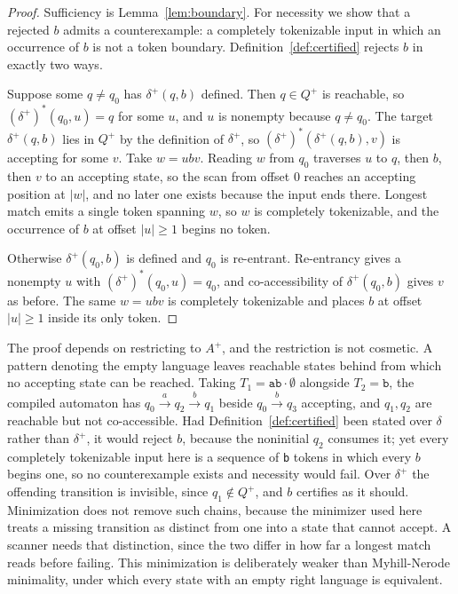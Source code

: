 \documentclass[11pt,a4paper]{article}
\theoremstyle{definition}
\theoremstyle{plain}
\newcommand{\code}[1]{\texttt{#1}}
\begin{document}
\begin{proof}
Sufficiency is Lemma~\ref{lem:boundary}. For necessity we show that a rejected $b$ admits a counterexample: a completely
tokenizable input in which an occurrence of $b$ is not a token boundary. Definition~\ref{def:certified} rejects $b$ in
exactly two ways.

Suppose some $q \neq q_0$ has $\delta^+(q,b)$ defined. Then $q \in Q^+$ is reachable, so $(\delta^+)^*(q_0,u) = q$ for
some $u$, and $u$ is nonempty because $q \neq q_0$. The target $\delta^+(q,b)$ lies in $Q^+$ by the definition of
$\delta^+$, so $(\delta^+)^*(\delta^+(q,b), v)$ is accepting for some $v$. Take $w = ubv$. Reading $w$ from $q_0$
traverses $u$ to $q$, then $b$, then $v$ to an accepting state, so the scan from offset $0$ reaches an accepting
position at $|w|$, and no later one exists because the input ends there. Longest match emits a single token spanning
$w$, so $w$ is completely tokenizable, and the occurrence of $b$ at offset $|u| \geq 1$ begins no token.

Otherwise $\delta^+(q_0,b)$ is defined and $q_0$ is re-entrant. Re-entrancy gives a nonempty $u$ with
$(\delta^+)^*(q_0,u) = q_0$, and co-accessibility of $\delta^+(q_0,b)$ gives $v$ as before. The same $w = ubv$ is
completely tokenizable and places $b$ at offset $|u| \geq 1$ inside its only token.
\end{proof}

The proof depends on restricting to $A^+$, and the restriction is not cosmetic. A pattern denoting the empty language
leaves reachable states behind from which no accepting state can be reached. Taking $T_1 = \code{ab}\cdot\emptyset$
alongside $T_2 = \code{b}$, the compiled automaton has $q_0 \xrightarrow{a} q_2 \xrightarrow{b} q_1$ beside
$q_0 \xrightarrow{b} q_3$ accepting, and $q_1, q_2$ are reachable but not co-accessible. Had
Definition~\ref{def:certified} been stated over $\delta$ rather than $\delta^+$, it would reject $b$, because the
noninitial $q_2$ consumes it; yet every completely tokenizable input here is a sequence of \code{b} tokens in which
every $b$ begins one, so no counterexample exists and necessity would fail. Over $\delta^+$ the offending transition is
invisible, since $q_1 \notin Q^+$, and $b$ certifies as it should. Minimization does not remove such chains, because the
minimizer used here treats a missing transition as distinct from one into a state that cannot accept. A scanner needs
that distinction, since the two differ in how far a longest match reads before failing. This minimization is
deliberately weaker than Myhill-Nerode minimality, under which every state with an empty right language is equivalent.
\end{document}
